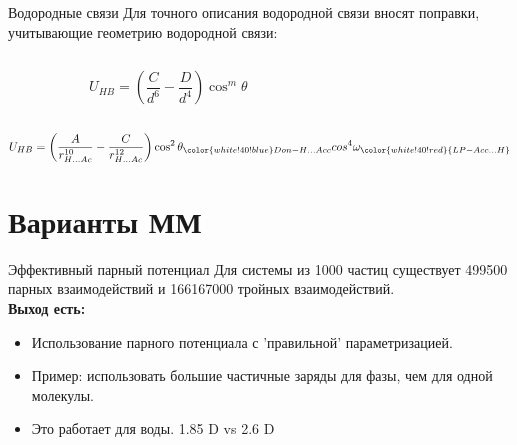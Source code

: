 \begin{frame}{Водородные связи}{}
Для точного описания водородной связи вносят поправки, учитывающие геометрию водородной связи:\\
\vspace{0.2cm}

\begin{columns}
\begin{column}{0.5\textwidth}
	\[ U_{HB}=\left ( \frac {C}{d^6} - \frac {D}{d^4 } \right ) \cos^m \theta \] 
\end{column}
\begin{column}{0.5\textwidth}
    \tiny{}



\end{column}
\end{columns}
\vspace{0.2cm}

\[ U_{HB}=\left ( \frac {A}{r^{10}_{H\dots Ac}} - \frac {C}{r^{12}_{H\dots Ac} } \right ) \cos^2 \theta_{\color{white!40!blue}Don-H\dots Acc}
    cos^4 \omega_{\color{white!40!red}{LP-Acc \dots H}}
\] 
\end{frame}

\section{Варианты ММ}
\begin{frame}{Эффективный парный потенциал}
		Для системы из 1000 частиц существует 499500 парных  взаимодействий и 166167000 тройных взаимодействий.\\
		\vspace{1cm}
		\textbf{Выход есть:}
			\begin{itemize}
				\item Использование парного потенциала с 'правильной' параметризацией. 
				\item Пример: использовать большие частичные заряды для фазы, чем для одной молекулы.
				\item Это работает для воды. 1.85 D vs 2.6 D
			\end{itemize}
\end{frame}




